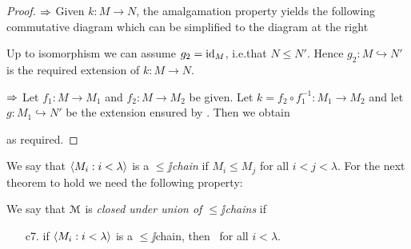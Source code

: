 \documentclass[creche.tex]{subfiles}
\begin{document}
\begin{proof}
$\Rightarrow$ Given $k:M\to N$, the amalgamation property yields the following commutative diagram which can be simplified to the diagram at the right

\hfil{}
\hfil{}

Up to isomorphism we can assume $g_2=\textrm{id}_M$, i.e.\@ that $N\le N'$. Hence $g_2:M\hookrightarrow N'$ is the required extension of $k:M\to N$.

$\Rightarrow$ Let  $f_1:M\to M_1$ and $f_2:M\to M_2$ be given. Let $k=f_2\circ f_1^{-1}:M_1\to M_2$ and let  $g:M_1\hookrightarrow N'$ be the extension ensured by . Then we obtain

\hfil{}

as required.
\end{proof}

We say that $\langle M_i:i<\lambda\rangle$ is a \emph{$\le\jj$chain\/} if $M_i\le M_j$ for all $i<j<\lambda$. For the next theorem to hold we need the following property:

\begin{definition}
We say that $\EuScript M$ is \emph{closed under union of $\le\jj$chains\/} if
\begin{itemize}
\item[c7.] if $\langle M_i:i<\lambda\rangle$ is a $\le\jj$chain,  then  \ for all $i<\lambda$.\QED
\end{itemize}
\end{definition}
\end{document}
